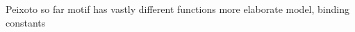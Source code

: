 \documentclass[../main.tex]{subfiles}
\begin{document}
Peixoto so far
motif has vastly different functions \cite{ingram2006network}
more elaborate model, binding constants	\cite{ingram2006network}
\end{document}
